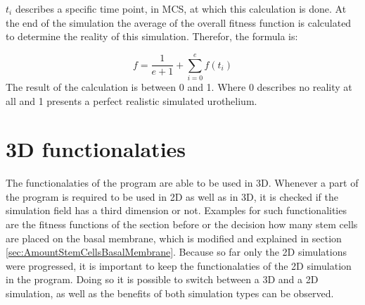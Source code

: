 $t_{i}$ describes a specific time point, in \ac{MCS}, at which this calculation is done. At the end of the simulation the average of the overall fitness function is calculated to determine the reality of this simulation. Therefor, the formula is:

\begin{equation} 
f = \dfrac{1}{e+1} + \sum_{i=0}^{e}{f(t_{i})}
\end{equation}
The result of the calculation is between 0 and 1. Where 0 describes no reality at all and 1 presents a perfect realistic simulated urothelium.


\section{3D functionalaties}\label{sec:3D}
The functionalaties of the program are able to be used in 3D. Whenever a part of the program is required to be used in 2D as well as in 3D, it is checked if the simulation field has a third dimension or not. Examples for such functionalities are the fitness functions of the section before or the decision how many stem cells are placed on the basal membrane, which is modified and explained in section \ref{sec:AmountStemCellsBasalMembrane}. \newline
Because so far only the 2D simulations were progressed, it is important to keep the functionalaties of the 2D simulation in the program. Doing so it is possible to switch between a 3D and a 2D simulation, as well as the benefits of both simulation types can be observed.